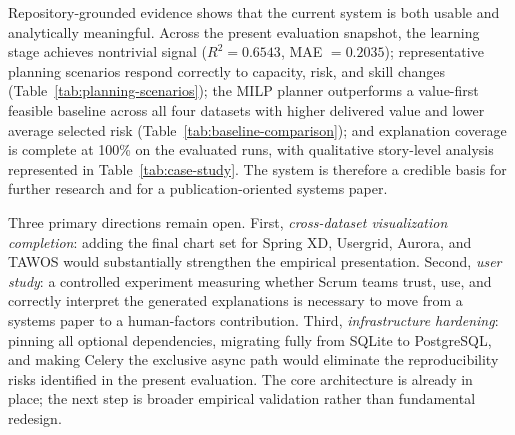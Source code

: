\documentclass[conference]{IEEEtran}
\begin{document}
Repository-grounded evidence shows that the current system is both usable and
analytically meaningful.
Across the present evaluation snapshot, the learning stage achieves nontrivial
signal ($R^{2} = 0.6543$, MAE $= 0.2035$); representative
planning scenarios respond correctly to capacity, risk, and skill changes
(Table~\ref{tab:planning-scenarios}); the MILP planner outperforms a value-first
feasible baseline across all four datasets with higher delivered value and lower
average selected risk (Table~\ref{tab:baseline-comparison}); and explanation
coverage is complete at 100\% on the evaluated runs, with qualitative story-level analysis
represented in Table~\ref{tab:case-study}.
The system is therefore a credible basis for further research and for a
publication-oriented systems paper.

Three primary directions remain open.
First, \emph{cross-dataset visualization completion}: adding the final chart set
for Spring XD, Usergrid, Aurora, and TAWOS would substantially strengthen the
empirical presentation.
Second, \emph{user study}: a controlled experiment measuring whether Scrum teams
trust, use, and correctly interpret the generated explanations is necessary to move
from a systems paper to a human-factors contribution.
Third, \emph{infrastructure hardening}: pinning all optional dependencies, migrating
fully from SQLite to PostgreSQL, and making Celery the exclusive async path would
eliminate the reproducibility risks identified in the present evaluation.
The core architecture is already in place; the next step is broader empirical
validation rather than fundamental redesign.

\balance
\end{document}
